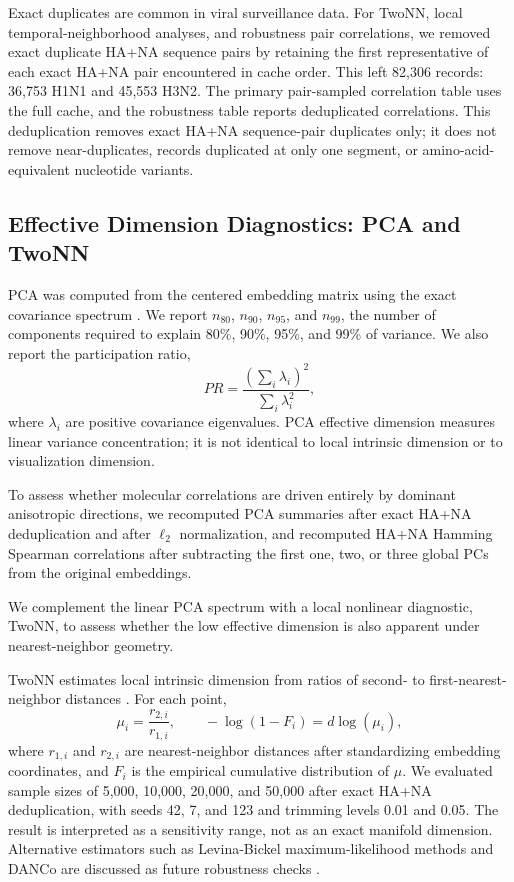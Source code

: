 \documentclass[11pt]{article}
\begin{document}
Exact duplicates are common in viral surveillance data. For TwoNN, local temporal-neighborhood analyses, and robustness pair correlations, we removed exact duplicate HA+NA sequence pairs by retaining the first representative of each exact HA+NA pair encountered in cache order. This left 82,306 records: 36,753 H1N1 and 45,553 H3N2. The primary pair-sampled correlation table uses the full cache, and the robustness table reports deduplicated correlations. This deduplication removes exact HA+NA sequence-pair duplicates only; it does not remove near-duplicates, records duplicated at only one segment, or amino-acid-equivalent nucleotide variants.

\subsection{Effective Dimension Diagnostics: PCA and TwoNN}

PCA was computed from the centered embedding matrix using the exact covariance spectrum \cite{jolliffe2002pca,jolliffe2016pca}. We report $n_{80}$, $n_{90}$, $n_{95}$, and $n_{99}$, the number of components required to explain 80\%, 90\%, 95\%, and 99\% of variance. We also report the participation ratio,
\[
PR=\frac{(\sum_i\lambda_i)^2}{\sum_i\lambda_i^2},
\]
where $\lambda_i$ are positive covariance eigenvalues. PCA effective dimension measures linear variance concentration; it is not identical to local intrinsic dimension or to visualization dimension.

To assess whether molecular correlations are driven entirely by dominant anisotropic directions, we recomputed PCA summaries after exact HA+NA deduplication and after $\ell_2$ normalization, and recomputed HA+NA Hamming Spearman correlations after subtracting the first one, two, or three global PCs from the original embeddings.

We complement the linear PCA spectrum with a local nonlinear diagnostic, TwoNN, to assess whether the low effective dimension is also apparent under nearest-neighbor geometry.

TwoNN estimates local intrinsic dimension from ratios of second- to first-nearest-neighbor distances \cite{facco2017intrinsic}. For each point,
\[
\mu_i=\frac{r_{2,i}}{r_{1,i}},
\qquad
-\log(1-F_i)=d\log(\mu_i),
\]
where $r_{1,i}$ and $r_{2,i}$ are nearest-neighbor distances after standardizing embedding coordinates, and $F_i$ is the empirical cumulative distribution of $\mu$. We evaluated sample sizes of 5,000, 10,000, 20,000, and 50,000 after exact HA+NA deduplication, with seeds 42, 7, and 123 and trimming levels 0.01 and 0.05. The result is interpreted as a sensitivity range, not as an exact manifold dimension. Alternative estimators such as Levina-Bickel maximum-likelihood methods and DANCo are discussed as future robustness checks \cite{levina2005maximum,ceruti2014danco}.
\end{document}
